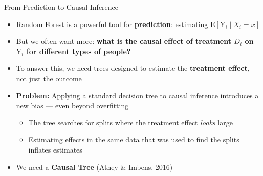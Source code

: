 \documentclass[hyperref={pdfpagelabels=false}]{beamer}
\begin{document}
\begin{frame}{From Prediction to Causal Inference}
	\begin{itemize}
		\item Random Forest is a powerful tool for \textbf{prediction}: estimating $\mathrm{E}[\mathrm{Y}_i \mid X_i = x]$
		\vspace{0.3cm}
		\item But we often want more: \textbf{what is the causal effect of treatment $D_i$ on $\mathrm{Y}_i$ for different types of people?}
		\vspace{0.3cm}
		\item To answer this, we need trees designed to estimate the \textbf{treatment effect}, not just the outcome
		\vspace{0.3cm}
		\item \textbf{Problem:} Applying a standard decision tree to causal inference introduces a new bias --- even beyond overfitting
		\vspace{0.2cm}
		\begin{itemize}
			\item The tree searches for splits where the treatment effect \textit{looks} large
			\vspace{0.2cm}
			\item Estimating effects in the same data that was used to find the splits inflates estimates
		\end{itemize}
		\vspace{0.3cm}
		\item[$\Rightarrow$] We need a \textbf{Causal Tree} (Athey \& Imbens, 2016)
	\end{itemize}
\end{frame}
\end{document}
